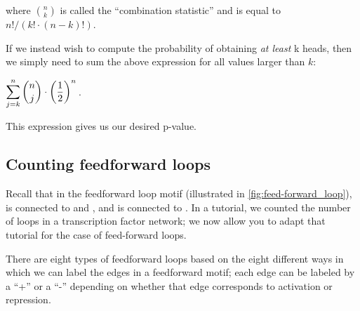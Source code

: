 \noindent where $\binom{n}{k}$ is called the ``combination statistic'' and is equal to $n!/(k! \cdot (n-k)!)$.

If we instead wish to compute the probability of obtaining \textit{at least} k heads, then we simply need to sum the above expression for all values larger than $k$:

\begin{center}
$\displaystyle\sum\limits_{j=k}^n{\dbinom{n}{j} \cdot \left(\dfrac{1}{2}\right)^n}$\,.
\end{center}

\noindent This expression gives us our desired p-value.\\

\begin{exercise}[%
When $n = 130$ and $k = 95$, compute the p-value given by the above expression. Is it likely that random chance could have produced 95 out of 130 loops in the transcription factor network that correspond to repression?
]\end{exercise}

\subsection{Counting feedforward loops}

Recall that in the feedforward loop motif (illustrated in \autoref{fig:feed-forward_loop}),  is connected to  and , and  is connected to . In a tutorial, we counted the number of loops in a transcription factor network; we now allow you to adapt that tutorial for the case of feed-forward loops.\\

\begin{exercise}\end{exercise}

There are eight types of feedforward loops based on the eight different ways in which we can label the edges in a feedforward motif; each edge can be labeled by a ``+'' or a ``-'' depending on whether that edge corresponds to activation or repression.\\

\begin{exercise}\end{exercise}

